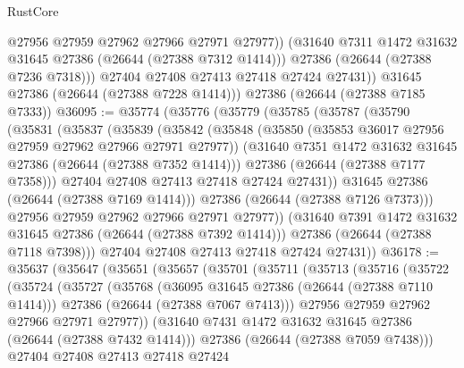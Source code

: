 \begin{lexlean}{RustCore}
\begin{coremodule}
                @27956
                @27959
                @27962
                @27966
                @27971
                @27977))
            (@31640 @7311 @1472 @31632 @31645 @27386 (@26644 (@27388 @7312 @1414)))
            @27386
            (@26644 (@27388 @7236 @7318)))
          @27404
          @27408
          @27413
          @27418
          @27424
          @27431))
      @31645
      @27386
      (@26644 (@27388 @7228 @1414)))
    @27386
    (@26644 (@27388 @7185 @7333))
@36095 := @35774
    (@35776
      (@35779
        (@35785
          (@35787
            (@35790
              (@35831
                (@35837
                  (@35839
                    (@35842
                      (@35848
                        (@35850 (@35853 @36017 @27956 @27959 @27962 @27966 @27971 @27977))
                        (@31640 @7351 @1472 @31632 @31645 @27386 (@26644 (@27388 @7352 @1414)))
                        @27386
                        (@26644 (@27388 @7177 @7358)))
                      @27404
                      @27408
                      @27413
                      @27418
                      @27424
                      @27431))
                  @31645
                  @27386
                  (@26644 (@27388 @7169 @1414)))
                @27386
                (@26644 (@27388 @7126 @7373)))
              @27956
              @27959
              @27962
              @27966
              @27971
              @27977))
          (@31640 @7391 @1472 @31632 @31645 @27386 (@26644 (@27388 @7392 @1414)))
          @27386
          (@26644 (@27388 @7118 @7398)))
        @27404
        @27408
        @27413
        @27418
        @27424
        @27431))
@36178 := @35637
    (@35647
      (@35651
        (@35657
          (@35701
            (@35711
              (@35713
                (@35716
                  (@35722
                    (@35724
                      (@35727
                        (@35768
                          (@36095 @31645 @27386 (@26644 (@27388 @7110 @1414)))
                          @27386
                          (@26644 (@27388 @7067 @7413)))
                        @27956
                        @27959
                        @27962
                        @27966
                        @27971
                        @27977))
                    (@31640 @7431 @1472 @31632 @31645 @27386 (@26644 (@27388 @7432 @1414)))
                    @27386
                    (@26644 (@27388 @7059 @7438)))
                  @27404
                  @27408
                  @27413
                  @27418
                  @27424

\end{coremodule}
\end{lexlean}
